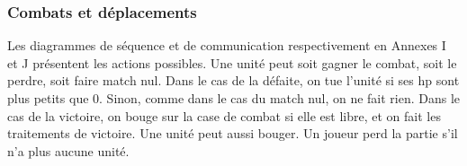 \subsubsection{Combats et déplacements}
Les diagrammes de séquence et de communication respectivement en Annexes I et J présentent les actions possibles. 
Une unité peut soit gagner le combat, soit le perdre, soit faire match nul. Dans le cas de la défaite, on tue l'unité si ses hp sont plus petits que 0. Sinon, comme dans le cas du match nul, on ne fait rien. Dans le cas de la victoire, on bouge sur la case de combat si elle est libre, et on fait les traitements de victoire. Une unité peut aussi bouger. Un joueur perd la partie s'il n'a plus aucune unité.



